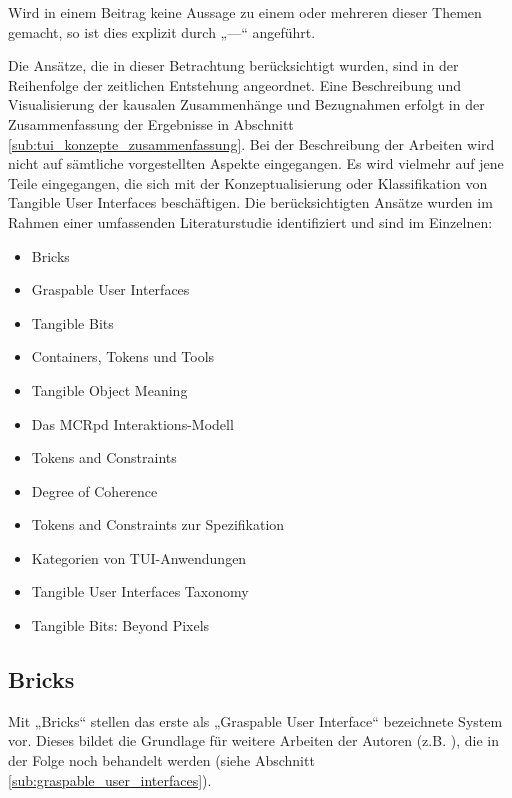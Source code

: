 Wird in einem Beitrag keine Aussage zu einem oder mehreren dieser Themen gemacht, so ist dies explizit durch „---“ angeführt.

Die Ansätze, die in dieser Betrachtung berücksichtigt wurden, sind in der Reihenfolge der zeitlichen Entstehung angeordnet. Eine Beschreibung und Visualisierung der kausalen Zusammenhänge und Bezugnahmen erfolgt in der Zusammenfassung der Ergebnisse in Abschnitt \ref{sub:tui_konzepte_zusammenfassung}. Bei der Beschreibung der Arbeiten wird nicht auf sämtliche vorgestellten Aspekte eingegangen. Es wird vielmehr auf jene Teile eingegangen, die sich mit der Konzeptualisierung oder Klassifikation von Tangible User Interfaces beschäftigen. Die berücksichtigten Ansätze wurden im Rahmen einer umfassenden Literaturstudie identifiziert und sind im Einzelnen:

    \begin{itemize}
    	\item Bricks \citep{Fitzmaurice95}
    	\item Graspable User Interfaces \citep{Fitzmaurice96}
    	\item Tangible Bits \citep{Ishii97}
    	\item Containers, Tokens und Tools \citep{Holmquist99}
		\item Tangible Object Meaning \citep{Underkoffler99}
    	\item Das MCRpd Interaktions-Modell \citep{Ullmer00}
    	\item Tokens and Constraints \citep{Ullmer02}
    	\item Degree of Coherence \citep{Koleva03}
    	\item Tokens and Constraints zur Spezifikation \citep{Shaer04}
    	\item Kategorien von \gls{TUI}-Anwendungen \citep{Klemmer04}
    	\item Tangible User Interfaces Taxonomy \citep{Fishkin04}
    	\item Tangible Bits: Beyond Pixels \citep{Ishii08}
    \end{itemize}

\subsection{Bricks} %
\label{sub:bricks}

Mit „Bricks“ stellen \citet{Fitzmaurice95} das erste als „Graspable User Interface“ bezeichnete System vor. Dieses bildet die Grundlage für weitere Arbeiten der Autoren (z.B. \citep{Fitzmaurice96}), die in der Folge noch behandelt werden (siehe Abschnitt \ref{sub:graspable_user_interfaces}). 

